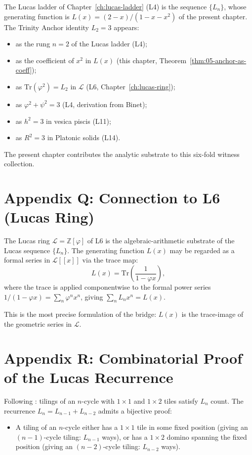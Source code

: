 The Lucas ladder of Chapter~\ref{ch:lucas-ladder} (L4) is the sequence
$\{L_n\}$, whose generating function is $L(x) = (2-x)/(1-x-x^2)$ of
the present chapter. The Trinity Anchor identity $L_2 = 3$ appears:
\begin{itemize}
  \item as the rung $n = 2$ of the Lucas ladder (L4);
  \item as the coefficient of $x^2$ in $L(x)$ (this chapter, Theorem~\ref{thm:05-anchor-as-coeff});
  \item as $\mathrm{Tr}(\varphi^2) = L_2$ in $\mathcal{L}$ (L6, Chapter~\ref{ch:lucas-ring});
  \item as $\varphi^2 + \psi^2 = 3$ (L4, derivation from Binet);
  \item as $h^2 = 3$ in vesica piscis (L11);
  \item as $R^2 = 3$ in Platonic solids (L14).
\end{itemize}

The present chapter contributes the analytic substrate to this
six-fold witness collection.

\section*{Appendix Q: Connection to L6 (Lucas Ring)}
\label{sec:05-app-Q}

The Lucas ring $\mathcal{L} = \mathbb{Z}[\varphi]$ of L6 is the
algebraic-arithmetic substrate of the Lucas sequence $\{L_n\}$.
The generating function $L(x)$ may be regarded as a formal series
in $\mathcal{L}[[x]]$ via the trace map:
\[
  L(x) = \mathrm{Tr}\left(\frac{1}{1 - \varphi x}\right),
\]
where the trace is applied componentwise to the formal power series
$1/(1-\varphi x) = \sum_n \varphi^n x^n$, giving $\sum_n L_n x^n = L(x)$.

This is the most precise formulation of the bridge: $L(x)$ is the
trace-image of the geometric series in $\mathcal{L}$.

\section*{Appendix R: Combinatorial Proof of the Lucas Recurrence}
\label{sec:05-app-R}

Following \cite{benjamin_quinn_proofs}: tilings of an $n$-cycle with
$1 \times 1$ and $1 \times 2$ tiles satisfy $L_n$ count. The recurrence
$L_n = L_{n-1} + L_{n-2}$ admits a bijective proof:
\begin{itemize}
  \item A tiling of an $n$-cycle either has a $1 \times 1$ tile in some
        fixed position (giving an $(n-1)$-cycle tiling: $L_{n-1}$ ways),
        or has a $1 \times 2$ domino spanning the fixed position (giving
        an $(n-2)$-cycle tiling: $L_{n-2}$ ways).
\end{itemize}

